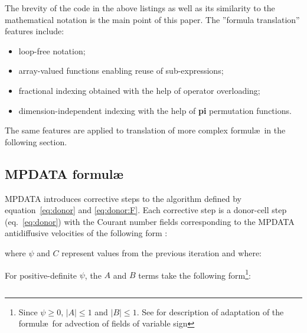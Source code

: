 \documentclass[twocolumn]{article}
\newcommand{\prog}[1]{{\rm\bf#1}}
\begin{document}
  The brevity of the code in the above listings as well as its similarity
    to the mathematical notation is the main point of this paper.
  The ''formula translation'' features include:
  \begin{itemize}
    \item{loop-free notation;}
    \item{array-valued functions enabling reuse of sub-expressions;}
    \item{fractional indexing obtained with the help of operator overloading;}
    \item{dimension-independent indexing with the help of \prog{pi} permutation functions.}
  \end{itemize}
  The same features are applied to translation of more complex formul\ae~in the
    following section.

  \subsection{MPDATA formul\ae}\label{sec:mpdata}

  MPDATA introduces corrective steps to the algorithm defined by equation~\ref{eq:donor} and \ref{eq:donor:F}.
  Each corrective step is a donor-cell step (eq.~\ref{eq:donor}) with the Courant number
    fields corresponding to the MPDATA antidiffusive velocities of the following 
    form \citep[eqs~13,~14~in][]{Smolarkiewicz_1984}:

  \vspace{-5ex}
  \begin{equation}\label{eq:antidiff1}
    
  \end{equation}
  where $\psi$ and $C$ represent values from the previous iteration and where:

  \vspace{-5ex}
  \begin{equation}\label{eq:antidiff2}
    
  \end{equation}
  For positive-definite $\psi$, the $A$ and $B$ terms take the 
  following form\footnote{
    Since $\psi\ge0$, $|A|\le1$ and $|B|\le1$. 
    See \citet[Sec. 4.2]{Smolarkiewicz_2006} for description of adaptation of the 
    formul\ae~for advection of fields of variable sign
  }:

  \vspace{-5ex}
  \begin{equation}\label{eq:A}
    
  \end{equation}
  \begin{equation}\label{eq:B}
    
  \end{equation}
\end{document}
